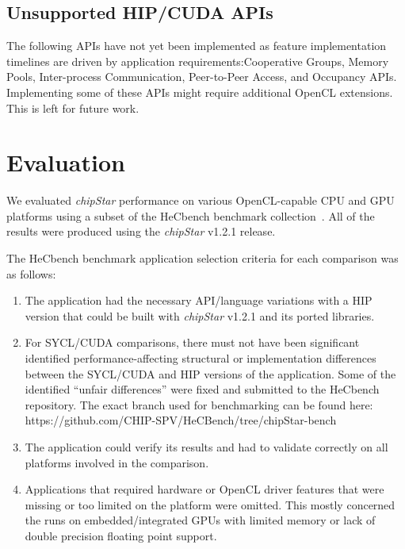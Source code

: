 \documentclass[Afour,sageh,times]{sagej}
\newcommand{\chipstar}{\textit{chipStar}\xspace}
\newcommand{\mycite}[1]{\citep{#1}}
\begin{document}
\subsection{Unsupported HIP/CUDA APIs}
The following APIs have not yet been implemented as feature implementation timelines are driven by application requirements:Cooperative Groups,  Memory Pools, Inter-process Communication, Peer-to-Peer Access, and Occupancy APIs. Implementing some of these APIs might require additional OpenCL extensions. This is left for future work.


\section{Evaluation}
\label{section:performance}

We evaluated  \chipstar  performance on various OpenCL-capable CPU and GPU platforms using a subset of the HeCbench benchmark collection~\mycite{HeCbench}. All of
the results were produced using the \chipstar v1.2.1  release.

The HeCbench benchmark application selection criteria for each comparison was as follows:
\begin{enumerate}
    \item The application had the necessary API/language variations with a HIP version that could be built with \chipstar v1.2.1 and its ported libraries.
    \item For SYCL/CUDA comparisons, there must not have been significant identified performance-affecting structural or implementation differences between the SYCL/CUDA and HIP versions of the application. Some of the identified ``unfair differences'' were fixed and submitted to the HeCbench repository.  The exact branch used for benchmarking can be found here: https://github.com/CHIP-SPV/HeCBench/tree/chipStar-bench

    \item The application could verify its results and had to validate correctly on all platforms involved in the comparison.
    \item Applications that required hardware or OpenCL driver features that were missing or too limited on the platform were omitted. This mostly concerned the runs on embedded/integrated GPUs with limited memory or lack of double precision floating point support.
\end{enumerate}
\end{document}
